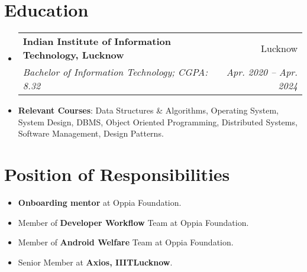 \documentclass[letterpaper,1pt]{article}
\makeatletter
\newcommand{\resumeItem}[2]{
  \item\small{
    \textbf{#1}{: #2 \vspace{-2pt}}
  }
}
\newcommand{\resumeSubheading}[4]{
  \vspace{-1pt}\item
    \begin{tabular*}{0.97\textwidth}{l@{\extracolsep{\fill}}r}
      \textbf{#1} & #2 \\
      \textit{\small#3} & \textit{\small #4} \\
    \end{tabular*}\vspace{-5pt}
}
\newcommand{\resumeSubHeadingListStart}{\begin{itemize}[leftmargin=*]}
\newcommand{\resumeSubHeadingListEnd}{\end{itemize}}
\makeatother
\begin{document}
\section{Education}
\resumeSubHeadingListStart
\resumeSubheading
{Indian Institute of Information Technology, Lucknow}{Lucknow}
{Bachelor of Information Technology;  CGPA: 8.32}{Apr. 2020 -- Apr. 2024}
\resumeItem{Relevant Courses}{Data Structures \& Algorithms, Operating System, System Design, DBMS, Object Oriented Programming, Distributed Systems, Software Management, Design Patterns.}
\resumeSubHeadingListEnd

\section{Position of Responsibilities}
\begin{itemize}
  \item \textbf{Onboarding mentor} at Oppia Foundation.
  \item Member of \textbf{Developer Workflow} Team at Oppia Foundation.
  \item Member of \textbf{Android Welfare} Team at Oppia Foundation.
  \item Senior Member at \textbf{Axios, IIITLucknow}.
\end{itemize}
\end{document}
